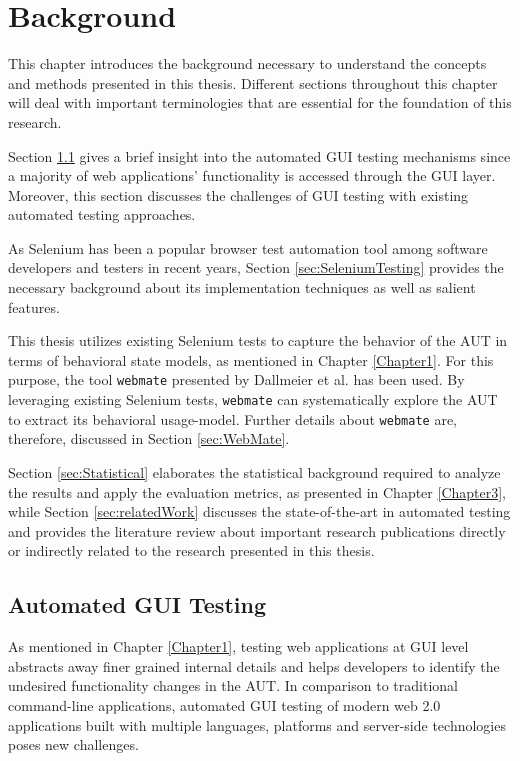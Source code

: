 \chapter{Background}
\label{Chapter2}


This chapter introduces the background necessary to understand the concepts and methods presented in this thesis. Different sections throughout this chapter will deal with important terminologies that are essential for the foundation of this research. 

Section \ref{sec:AutomatedGUITesting} gives a brief insight into the automated GUI testing mechanisms since a majority of web applications' functionality is accessed through the GUI layer. Moreover, this section discusses the challenges of GUI testing with existing automated testing approaches. 

As Selenium \cite{websiteSelenium} has been a popular browser test automation tool among software developers and testers in recent years, Section \ref{sec:SeleniumTesting} provides the necessary background about its implementation techniques as well as salient features.

This thesis utilizes existing Selenium tests to capture the behavior of the AUT in terms of behavioral state models, as mentioned in Chapter \ref{Chapter1}. For this purpose, the tool \texttt{webmate} presented by Dallmeier et al. \cite{webmate} has been used. By leveraging existing Selenium tests, \texttt{webmate} can systematically explore the AUT to extract its behavioral usage-model. Further details about \texttt{webmate} are, therefore, discussed in Section \ref{sec:WebMate}.

Section \ref{sec:Statistical} elaborates the statistical background required to analyze the results and apply the evaluation metrics, as presented in Chapter \ref{Chapter3}, while Section \ref{sec:relatedWork} discusses the state-of-the-art in automated testing and provides the literature review about important research publications directly or indirectly related to the research presented in this thesis. 

\section{Automated GUI Testing}
\label{sec:AutomatedGUITesting}
As mentioned in Chapter \ref{Chapter1}, testing web applications at GUI level abstracts away finer grained internal details and helps developers to identify the undesired functionality changes in the AUT. In comparison to traditional command-line applications, automated GUI testing of modern web 2.0 applications built with multiple languages, platforms and server-side technologies poses new challenges.

